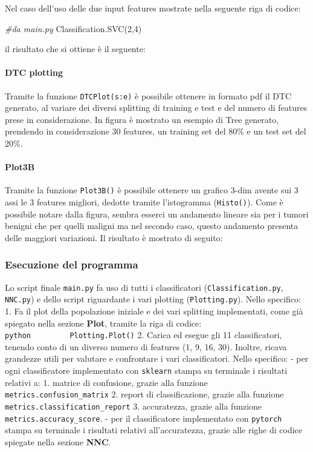 \documentclass[11pt]{article}
\newenvironment{Shaded}{}{}
\newcommand{\DecValTok}[1]{\textcolor[rgb]{0.25,0.63,0.44}{{#1}}}
\newcommand{\CommentTok}[1]{\textcolor[rgb]{0.38,0.63,0.69}{\textit{{#1}}}}
\newcommand{\NormalTok}[1]{{#1}}
\begin{document}
Nel caso dell'uso delle due input features mostrate nella seguente riga
di codice:

\begin{Shaded}
\begin{Highlighting}[]
\CommentTok{#da main.py}
\NormalTok{Classification.SVC(}\DecValTok{2}\NormalTok{,}\DecValTok{4}\NormalTok{)    }
\end{Highlighting}
\end{Shaded}

il risultato che si ottiene è il seguente:

    \paragraph{DTC plotting}\label{dtc-plotting}

    Tramite la funzione \texttt{DTCPlot(s:e)} è possibile ottenere in
formato pdf il DTC generato, al variare dei diversi splitting di
training e test e del numero di features prese in considerazione. In
figura è mostrato un esempio di Tree generato, prendendo in
considerazione 30 features, un training set del 80\% e un test set del
20\%.

    \paragraph{Plot3B}\label{plot3b}

    Tramite la funzione \texttt{Plot3B()} è possibile ottenere un grafico
3-dim avente sui 3 assi le 3 features migliori, dedotte tramite
l'istogramma (\texttt{Histo()}). Come è possibile notare dalla figura,
sembra esserci un andamento lineare sia per i tumori benigni che per
quelli maligni ma nel secondo caso, questo andamento presenta delle
maggiori variazioni. Il risultato è mostrato di seguito: 

    \subsubsection{Esecuzione del programma}\label{esecuzione-del-programma}

    Lo script finale \texttt{main.py} fa uso di tutti i classificatori
(\texttt{Classification.py}, \texttt{NNC.py}) e dello script riguardante
i vari plotting (\texttt{Plotting.py}). Nello specifico: 1. Fa il plot
della popolazione iniziale e dei vari splitting implementati, come già
spiegato nella sezione \textbf{Plot}, tramite la riga di codice:
\texttt{python\ \ \ \ \ \ \ \ \ Plotting.Plot()} 2. Carica ed esegue gli
11 classificatori, tenendo conto di un diverso numero di features (1, 9,
16, 30). Inoltre, ricava grandezze utili per valutare e confrontare i
vari classificatori. Nello specifico: - per ogni classificatore
implementato con \texttt{sklearn} stampa su terminale i risultati
relativi a: 1. matrice di confusione, grazie alla funzione
\texttt{metrics.confusion\_matrix} 2. report di classificazione, grazie
alla funzione \texttt{metrics.classification\_report} 3. accuratezza,
grazie alla funzione \texttt{metrics.accuracy\_score}. - per il
classificatore implementato con \texttt{pytorch} stampa su terminale i
risultati relativi all'accuratezza, grazie alle righe di codice spiegate
nella sezione \textbf{NNC}.
\end{document}
